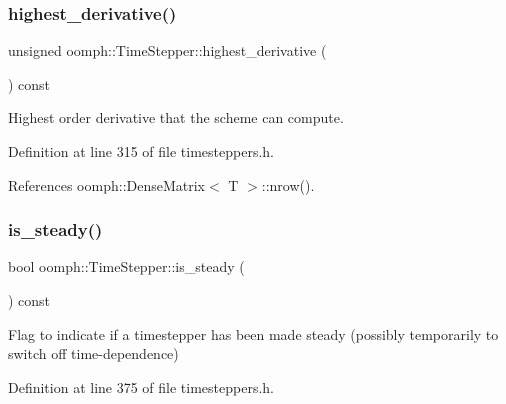 \subsubsection{\texorpdfstring{highest\+\_\+derivative()}{highest\_derivative()}}
{\footnotesize\ttfamily unsigned oomph\+::\+Time\+Stepper\+::highest\+\_\+derivative (\begin{DoxyParamCaption}{ }\end{DoxyParamCaption}) const\hspace{0.3cm}{\ttfamily [inline]}}



Highest order derivative that the scheme can compute. 



Definition at line 315 of file timesteppers.\+h.



References oomph\+::\+Dense\+Matrix$<$ T $>$\+::nrow().

\mbox{\label{classoomph_1_1TimeStepper_ad341ba9e80265e1c26c1cda0f40c8292}} 
\subsubsection{\texorpdfstring{is\+\_\+steady()}{is\_steady()}}
{\footnotesize\ttfamily bool oomph\+::\+Time\+Stepper\+::is\+\_\+steady (\begin{DoxyParamCaption}{ }\end{DoxyParamCaption}) const\hspace{0.3cm}{\ttfamily [inline]}}



Flag to indicate if a timestepper has been made steady (possibly temporarily to switch off time-\/dependence) 



Definition at line 375 of file timesteppers.\+h.



